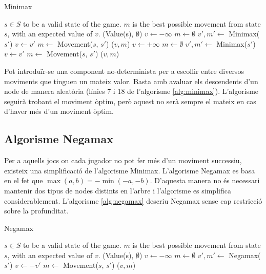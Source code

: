 \documentclass[12pt,a4paper]{article}
\begin{document}
\begin{algorithm}[H]
\caption{Minimax}
\label{alg:minimax}
\begin{algorithmic}[5]
\Require $s \in S$ to be a valid state of the game.
\Ensure $m$ is the best possible movement from state $s$, with an expected value of $v$. 
	\State \Return (Value(s), $\emptyset$)
\Else
		\State $v \leftarrow -\infty$
		\State $m \leftarrow \emptyset$
			\State $v',m' \leftarrow$ Minimax($s'$)
				\State $v \leftarrow v'$
				\State $m \leftarrow$ Movement($s$, $s'$)
			\EndIf
		\EndFor
		\State \Return ($v, m$)
	\Else
		\State $v \leftarrow +\infty$
		\State $m \leftarrow \emptyset$
			\State $v',m' \leftarrow$ Minimax($s'$)
				\State $v \leftarrow v'$
				\State $m \leftarrow$ Movement($s$, $s'$)
			\EndIf
		\EndFor
		\State \Return ($v, m$)
	\EndIf
\EndIf
\end{algorithmic}
\end{algorithm}

Pot introduïr-se una component no-determinista per a escollir entre diversos moviments que tinguen un mateix valor. Basta amb avaluar els descendents d'un node de manera aleatòria (línies 7 i 18 de l'algorisme \ref{alg:minimax}). L'algorisme seguirà trobant el moviment òptim, però aquest no serà sempre el mateix en cas d'haver més d'un moviment òptim.\\

\subsection{Algorisme Negamax}
Per a aquells jocs on cada jugador no pot fer més d'un moviment successiu, existeix una simplificació de l'algorisme Minimax. L'algorisme Negamax\cite{knuth1976analysis} es basa en el fet que $\max(a,b) = -\min(-a,-b)$. D'aquesta manera no és necessari mantenir dos tipus de nodes distints en l'arbre i l'algorisme es simplifica considerablement. L'algorisme \ref{alg:negamax} descriu Negamax sense cap restricció sobre la profunditat.\\

\begin{algorithm}[H]
\caption{Negamax}
\label{alg:negamax}
\begin{algorithmic}[5]
\Require $s \in S$ to be a valid state of the game.
\Ensure $m$ is the best possible movement from state $s$, with an expected value of $v$. 
	\State \Return (Value(s), $\emptyset$)
\Else
	\State $v \leftarrow -\infty$
	\State $m \leftarrow \emptyset$
		\State $v',m' \leftarrow$ Negamax($s'$)
			\State $v \leftarrow -v'$
			\State $m \leftarrow$ Movement($s$, $s'$)
		\EndIf
	\EndFor
	\State \Return ($v, m$)
\EndIf
\end{algorithmic}
\end{algorithm}
\end{document}
